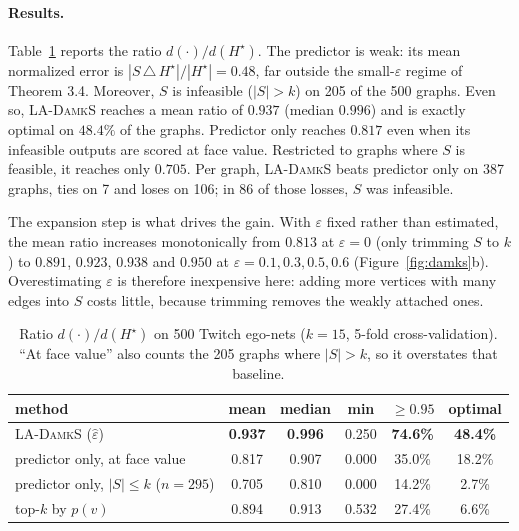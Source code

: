 \paragraph{Results.} Table~\ref{tab:damks-quality} reports the ratio $d(\cdot)/d(H^\star)$.
The predictor is weak: its mean normalized error is $|S\,\triangle\,H^\star|/|H^\star| = 0.48$,
far outside the small-$\varepsilon$ regime of Theorem 3.4. Moreover, $S$ is infeasible
($|S| > k$) on 205 of the 500 graphs. Even so, \textsc{LA-DamkS} reaches a mean ratio of $0.937$
(median $0.996$) and is exactly optimal on $48.4\%$ of the graphs. Predictor only reaches
$0.817$ even when its infeasible outputs are scored at face value. Restricted to graphs where
$S$ is feasible, it reaches only $0.705$. Per graph, \textsc{LA-DamkS} beats predictor only on 387
graphs, ties on 7 and loses on 106; in 86 of those losses, $S$ was infeasible.

The expansion step is what drives the gain. With $\varepsilon$ fixed rather than estimated,
the mean ratio increases monotonically from $0.813$ at $\varepsilon=0$ (only trimming $S$ to
$k$) to $0.891$, $0.923$, $0.938$ and $0.950$ at $\varepsilon = 0.1, 0.3, 0.5, 0.6$
(Figure~\ref{fig:damks}b). Overestimating $\varepsilon$ is therefore inexpensive here: adding
more vertices with many edges into $S$ costs little, because trimming removes the weakly
attached ones.

\begin{table}[t]
\centering
\begin{tabular}{lccccc}
\toprule
method & mean & median & min & $\ge 0.95$ & optimal \\
\midrule
\textsc{LA-DamkS} ($\hat\varepsilon$)         & \textbf{0.937} & \textbf{0.996} & 0.250 & \textbf{74.6\%} & \textbf{48.4\%} \\
predictor only, at face value          & 0.817 & 0.907 & 0.000 & 35.0\% & 18.2\% \\
predictor only, $|S|\le k$ ($n{=}295$) & 0.705 & 0.810 & 0.000 & 14.2\% & 2.7\% \\
top-$k$ by $p(v)$                      & 0.894 & 0.913 & 0.532 & 27.4\% & 6.6\% \\
\bottomrule
\end{tabular}
\caption{Ratio $d(\cdot)/d(H^\star)$ on 500 Twitch ego-nets ($k = 15$, 5-fold
cross-validation). ``At face value'' also counts the 205 graphs where $|S| > k$, so it
overstates that baseline.}
\label{tab:damks-quality}
\end{table}


